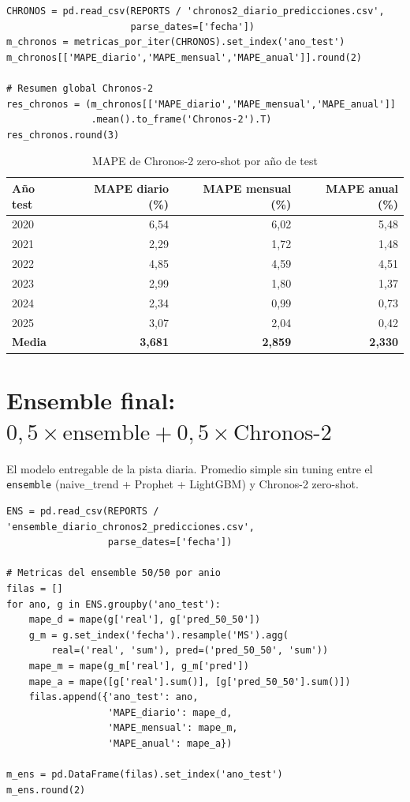\documentclass[12pt,a4paper]{article}
\begin{document}
\begin{lstlisting}[caption={Carga y evaluación de Chronos-2}]
CHRONOS = pd.read_csv(REPORTS / 'chronos2_diario_predicciones.csv',
                      parse_dates=['fecha'])
m_chronos = metricas_por_iter(CHRONOS).set_index('ano_test')
m_chronos[['MAPE_diario','MAPE_mensual','MAPE_anual']].round(2)

# Resumen global Chronos-2
res_chronos = (m_chronos[['MAPE_diario','MAPE_mensual','MAPE_anual']]
               .mean().to_frame('Chronos-2').T)
res_chronos.round(3)
\end{lstlisting}

\begin{table}[H]
\centering
\caption{MAPE de Chronos-2 zero-shot por año de test}
\begin{tabular}{lrrr}
\toprule
Año test & MAPE diario (\%) & MAPE mensual (\%) & MAPE anual (\%) \\
\midrule
2020 & 6{,}54 & 6{,}02 & 5{,}48 \\
2021 & 2{,}29 & 1{,}72 & 1{,}48 \\
2022 & 4{,}85 & 4{,}59 & 4{,}51 \\
2023 & 2{,}99 & 1{,}80 & 1{,}37 \\
2024 & 2{,}34 & 0{,}99 & 0{,}73 \\
2025 & 3{,}07 & 2{,}04 & 0{,}42 \\
\midrule
\textbf{Media} & \textbf{3{,}681} & \textbf{2{,}859} & \textbf{2{,}330} \\
\bottomrule
\end{tabular}
\end{table}

\section{Ensemble final: $0{,}5 \times \text{ensemble} + 0{,}5 \times \text{Chronos-2}$}
\label{sec:ensemble50}

El modelo entregable de la pista diaria. Promedio simple sin tuning entre
el \texttt{ensemble} (naive\_trend + Prophet + LightGBM) y Chronos-2
zero-shot.

\begin{lstlisting}[caption={Carga del ensemble 50/50 y cálculo de métricas}]
ENS = pd.read_csv(REPORTS / 'ensemble_diario_chronos2_predicciones.csv',
                  parse_dates=['fecha'])

# Metricas del ensemble 50/50 por anio
filas = []
for ano, g in ENS.groupby('ano_test'):
    mape_d = mape(g['real'], g['pred_50_50'])
    g_m = g.set_index('fecha').resample('MS').agg(
        real=('real', 'sum'), pred=('pred_50_50', 'sum'))
    mape_m = mape(g_m['real'], g_m['pred'])
    mape_a = mape([g['real'].sum()], [g['pred_50_50'].sum()])
    filas.append({'ano_test': ano,
                  'MAPE_diario': mape_d,
                  'MAPE_mensual': mape_m,
                  'MAPE_anual': mape_a})

m_ens = pd.DataFrame(filas).set_index('ano_test')
m_ens.round(2)
\end{lstlisting}
\end{document}
